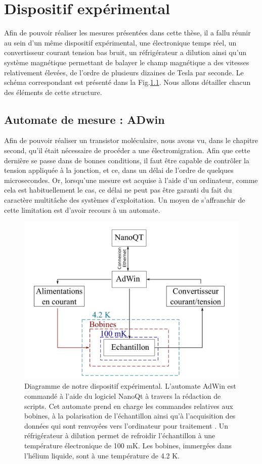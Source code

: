 \chapter{Dispositif expérimental}


Afin de pouvoir réaliser les mesures présentées dans cette thèse, il a fallu réunir au sein d’un même dispositif expérimental, une électronique temps réel, un convertisseur courant tension bas bruit, un réfrigérateur a dilution ainsi qu’un système magnétique permettant de balayer le champ magnétique a des vitesses relativement élevées, de l’ordre de plusieurs dizaines de Tesla par seconde. Le schéma correspondant est présenté dans la Fig.\ref{ann3fig}. Nous allons détailler chacun des éléments de cette structure.

\section{Automate de mesure : ADwin}
Afin de pouvoir réaliser un transistor moléculaire, nous avons vu, dans le chapitre second, qu’il était nécessaire de procéder a une électromigration. Afin que cette dernière se passe dans de bonnes conditions, il faut être capable de contrôler la tension appliquée à la jonction, et ce, dans un délai de l’ordre
de quelques microsecondes. Or, lorsqu’une mesure est acquise à l’aide d’un ordinateur, comme cela est habituellement le cas, ce délai ne peut pas être garanti du fait du caractère multitâche des systèmes d’exploitation. Un moyen de s’affranchir de cette limitation est d’avoir recours à un automate.

\begin{figure}
\centering \includegraphics[scale=0.35]{Annexe4/annexe4fig.png}
\caption{Diagramme de notre dispositif expérimental. L’automate AdWin est commandé à l’aide du logiciel NanoQt à travers la rédaction de scripts. Cet automate prend en charge les commandes relatives aux bobines, à la polarisation de l’échantillon ainsi qu’à l’acquisition des données qui sont renvoyées vers l’ordinateur pour traitement . Un réfrigérateur à dilution permet de refroidir l’échantillon à une température électronique de 100 mK. Les bobines, immergées dans l’hélium liquide, sont à une température de 4.2 K.}
\label{ann3fig}
\end{figure}


